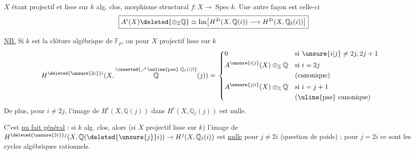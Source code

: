 $X$ étant projectif et lisse sur $k$ alg. clos, %
morphisme structural $f:X\longrightarrow\operatorname{Spec} k$. %
Une autre façon est celle-ci %
\[
 \boxed{A^i(X)\deleted{\otimes_{\mathbb{Z}}\mathbb{Q}}\simeq
 \operatorname{Im}\bigl[H^{2i}(X,\mathbb{Q}(i))\longrightarrow
 H^{2i}(X,\mathbb{Q}_{\ell}(i))\bigr]} %
\]

\uline{NB.} Si $k$ est la clôture algébrique %
de $\mathbb{F}_p$, on  pour $X$ projectif lisse sur %
$k$ %
\[
\begin{aligned}
H^{\deleted{\unsure{2i}}i}(X,\overset{\inserted{\nearrow\,\text{\uuline{pas} }\mathbb{Q}_{\ell}(i)!}}{\mathbb{Q}}(j))
={}&\left\{\begin{aligned}
&0 &&\text{si }\unsure{i|j}\ne 2j,2j+1\\ %
&A^{\unsure{i|j}}(X)\otimes_{\mathbb{Z}}\mathbb{Q}
 &&\text{si }i=2j\\ %
& &&\text{(canonique)}\\ %
&A^{\unsure{j|i}}(X)\otimes_{\mathbb{Z}}\mathbb{Q}
 &&\text{si }i=j+1\\ %
& &&\text{(\uline{pas} canonique)}
\end{aligned}\right. %
\end{aligned}
\]
De plus, pour $i\ne 2j$, l'image de %
$H^i(X,\mathbb{Q}(j))$ dans $H^i(X,\mathbb{Q}_{\ell}(j))$ est nulle. %

C'est \uline{un fait général} : si $k$ alg. %
clos, alors (si $X$ projectif lisse sur $k$) l'image %
de $H^{\deleted{\unsure{2i}}j}(X,\mathbb{Q}(\deleted{\unsure{j}}i))\to H^j(X,\mathbb{Q}_{\ell}(i))$ %
est \uline{nulle} pour $j\ne 2i$ (question de %
poids) ; pour $j=2i$ ce sont les cycles %
algébriques  rationnels. %

